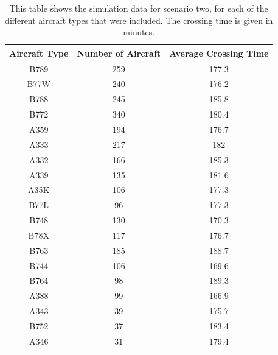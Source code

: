 \documentclass[stu, a4paper, 12pt, floatsintext]{apa7}
\numberwithin{figure}{section}
\numberwithin{table}{section}
\numberwithin{equation}{section}
\begin{document}
\begin{table}[H]
    \centering
    \caption{This table shows the simulation data for scenario two, for each of the different aircraft types that were included. The crossing time is given in minutes.}
    \label{tab:32}
    \begin{tabular}{@{}ccc@{}}
    \toprule
    \textbf{Aircraft Type} & \textbf{Number of Aircraft} & \textbf{Average Crossing Time} \\ \midrule
    B789                   & 259                         & 177.3                          \\
    B77W                   & 240                         & 176.2                          \\
    B788                   & 245                         & 185.8                          \\
    B772                   & 340                         & 180.4                          \\
    A359                   & 194                         & 176.7                          \\
    A333                   & 217                         & 182                            \\
    A332                   & 166                         & 185.3                          \\
    A339                   & 135                         & 181.6                          \\
    A35K                   & 106                         & 177.3                          \\
    B77L                   & 96                          & 177.3                          \\
    B748                   & 130                         & 170.3                          \\
    B78X                   & 117                         & 176.7                          \\
    B763                   & 185                         & 188.7                          \\
    B744                   & 106                         & 169.6                          \\
    B764                   & 98                          & 189.3                          \\
    A388                   & 99                          & 166.9                          \\
    A343                   & 39                          & 175.7                          \\
    B752                   & 37                          & 183.4                          \\
    A346                   & 31                          & 179.4                          \\ \bottomrule
    \end{tabular}
\end{table}
\end{document}
